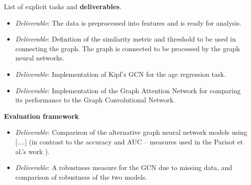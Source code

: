 \documentclass[12pt,a4paper,twoside]{article}
\begin{document}
List of explicit tasks and \textbf{deliverables}.
\begin{itemize}
  \item \textit{Deliverable}: The data is preprocessed into features and is ready for analysis. %
  \item \textit{Deliverable}: Definition of the similarity metric and threshold to be used in connecting the graph. The graph is connected to be processed by the graph neural networks.
  \item \textit{Deliverable}: Implementation of Kipf's GCN \cite{kipf2017semi} for the age regression task.
  \item \textit{Deliverable}: Implementation of the Graph Attention Network for comparing its performance to the Graph Convolutional Network.
\end{itemize}

\textbf{Evaluation framework}

\begin{itemize}
  \item  \textit{Deliverable}: Comparison of the alternative graph neural network models using [....] (in contrast to the accuracy and AUC – measures used in the Parisot et al.'s work \cite{parisot2018disease}).
  \item \textit{Deliverable}: A robustness measure for the GCN due to missing data, and comparison of robustness of the two models.
\end{itemize}
\end{document}
